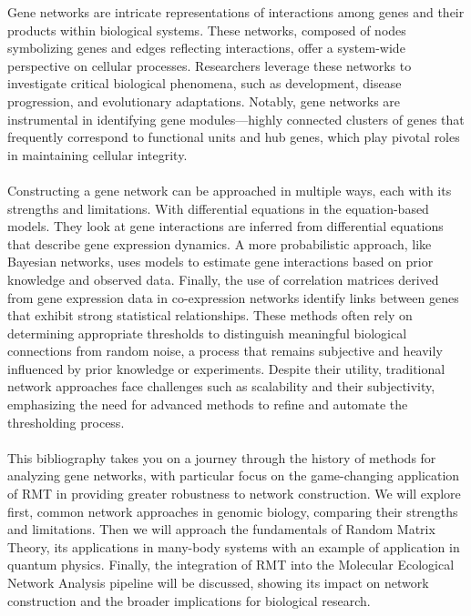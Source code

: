 Gene networks are intricate representations of interactions among genes and their products within biological systems\cite{oldham_conservation_2006}.
These networks, composed of nodes symbolizing genes and edges reflecting interactions\cite{barabasi_network_2004}, offer a system-wide perspective on cellular processes.
Researchers leverage these networks to investigate critical biological phenomena\cite{barabasi_network_2004}, such as development\cite{montoya_ecological_2006}, disease progression\cite{friedman_using_2000}, and evolutionary adaptations\cite{dunne_food-web_2002}.
Notably, gene networks are instrumental in identifying gene modules—highly connected clusters of genes that frequently correspond to functional units and hub genes, which play pivotal roles in maintaining cellular integrity\cite{zhang_general_2005}.
\\\\
Constructing a gene network can be approached in multiple ways, each with its strengths and limitations.
With differential equations in the equation-based models.
They look at gene interactions are inferred from differential equations that describe gene expression dynamics\cite{deng_molecular_2012}.
A more probabilistic approach, like Bayesian networks, uses models to estimate gene interactions based on prior knowledge and observed data\cite{gerstung_quantifying_2009}.
Finally, the use of correlation matrices derived from gene expression data in co-expression networks identify links between genes that exhibit strong statistical relationships\cite{zhang_general_2005}.
These methods often rely on determining appropriate thresholds to distinguish meaningful biological connections from random noise, a process that remains subjective and heavily influenced by prior knowledge or experiments.
Despite their utility, traditional network approaches face challenges such as scalability and their subjectivity, emphasizing the need for advanced methods to refine and automate the thresholding process\cite{deng_molecular_2012}.
\\\\
This bibliography takes you on a journey through the history of methods for analyzing gene networks, with particular focus on the game-changing application of RMT in providing greater robustness to network construction.
We will explore first, common network approaches in genomic biology, comparing their strengths and limitations.
Then we will approach the fundamentals of Random Matrix Theory, its applications in many-body systems with an example of application in quantum physics.
Finally, the integration of RMT into the Molecular Ecological Network Analysis pipeline will be discussed, showing its impact on network construction and the broader implications for biological research.